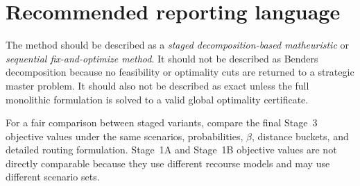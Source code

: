 \documentclass[11pt]{article}
\begin{document}
\section{Recommended reporting language}

The method should be described as a \emph{staged decomposition-based
matheuristic} or \emph{sequential fix-and-optimize method}.  It should not be
described as Benders decomposition because no feasibility or optimality cuts
are returned to a strategic master problem.  It should also not be described
as exact unless the full monolithic formulation is solved to a valid global
optimality certificate.

For a fair comparison between staged variants, compare the final Stage~3
objective values under the same scenarios, probabilities, $\beta$, distance
buckets, and detailed routing formulation.  Stage~1A and Stage~1B objective
values are not directly comparable because they use different recourse models
and may use different scenario sets.
\end{document}
